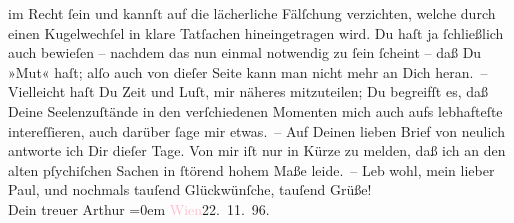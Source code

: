                im Recht ſein und kannſt auf die lächerliche Fälſchung verzichten, welche durch einen
               Kugelwechſel in klare Tatſachen hineingetragen wird. Du haſt ja ſchließlich auch
               bewieſen – nachdem das nun einmal notwendig zu ſein ſcheint – daß Du »Mut« haſt; alſo
               auch von dieſer Seite kann man nicht mehr an Dich heran. –\pend
           \pstart
           Vielleicht haſt Du Zeit und Luſt, mir näheres mitzuteilen; Du begreifſt es, daß Deine
               Seelenzuſtände in den verſchiedenen Momenten mich auch aufs lebhafteſte
               intereſſieren, auch darüber ſage mir etwas. –\pend
           \pstart
           Auf Deinen lieben Brief von neulich antworte ich Dir dieſer Tage. Von mir iſt nur in
               Kürze zu melden, daß ich an den alten pſychiſchen Sachen in ſtörend hohem Maße
               leide. –\pend
           \pstart
           Leb wohl, mein lieber Paul, und nochmals tauſend Glückwünſche, tauſend
               Grüße!{\\[\baselineskip]}Dein treuer \spacefill\mbox{Arthur}\pend
           \leftskip=0em{}\pstart
           \textcolor{pink}{Wien}{}\ledrightnote{\textcolor{pink}{Wien}}{ }22. 11. 96.\pend
           \endnumbering{}\begin{anhang}\end{anhang}
      